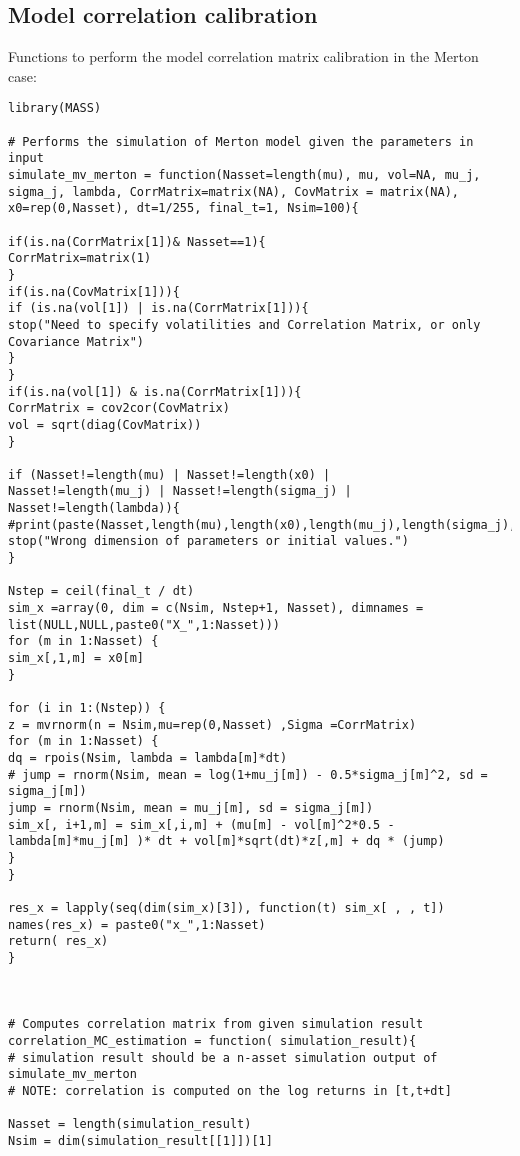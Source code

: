 \subsection{Model correlation calibration}
\bigskip
\noindent
Functions to perform the model correlation matrix calibration in the Merton case:

\begin{lstlisting}
library(MASS)

# Performs the simulation of Merton model given the parameters in input
simulate_mv_merton = function(Nasset=length(mu), mu, vol=NA, mu_j, sigma_j, lambda, CorrMatrix=matrix(NA), CovMatrix = matrix(NA),
x0=rep(0,Nasset), dt=1/255, final_t=1, Nsim=100){

if(is.na(CorrMatrix[1])& Nasset==1){
CorrMatrix=matrix(1)
}
if(is.na(CovMatrix[1])){
if (is.na(vol[1]) | is.na(CorrMatrix[1])){
stop("Need to specify volatilities and Correlation Matrix, or only Covariance Matrix")
}
}
if(is.na(vol[1]) & is.na(CorrMatrix[1])){
CorrMatrix = cov2cor(CovMatrix)
vol = sqrt(diag(CovMatrix))
}

if (Nasset!=length(mu) | Nasset!=length(x0) |
Nasset!=length(mu_j) | Nasset!=length(sigma_j) | Nasset!=length(lambda)){
#print(paste(Nasset,length(mu),length(x0),length(mu_j),length(sigma_j),length(lambda)))
stop("Wrong dimension of parameters or initial values.")
}

Nstep = ceil(final_t / dt)
sim_x =array(0, dim = c(Nsim, Nstep+1, Nasset), dimnames = list(NULL,NULL,paste0("X_",1:Nasset)))
for (m in 1:Nasset) {
sim_x[,1,m] = x0[m]
}

for (i in 1:(Nstep)) {
z = mvrnorm(n = Nsim,mu=rep(0,Nasset) ,Sigma =CorrMatrix)
for (m in 1:Nasset) {
dq = rpois(Nsim, lambda = lambda[m]*dt)
# jump = rnorm(Nsim, mean = log(1+mu_j[m]) - 0.5*sigma_j[m]^2, sd = sigma_j[m])
jump = rnorm(Nsim, mean = mu_j[m], sd = sigma_j[m])
sim_x[, i+1,m] = sim_x[,i,m] + (mu[m] - vol[m]^2*0.5 -lambda[m]*mu_j[m] )* dt + vol[m]*sqrt(dt)*z[,m] + dq * (jump)
}
}

res_x = lapply(seq(dim(sim_x)[3]), function(t) sim_x[ , , t])
names(res_x) = paste0("x_",1:Nasset)
return( res_x)
}



# Computes correlation matrix from given simulation result
correlation_MC_estimation = function( simulation_result){
# simulation result should be a n-asset simulation output of simulate_mv_merton
# NOTE: correlation is computed on the log returns in [t,t+dt] 

Nasset = length(simulation_result) 
Nsim = dim(simulation_result[[1]])[1] 


\end{lstlisting}
